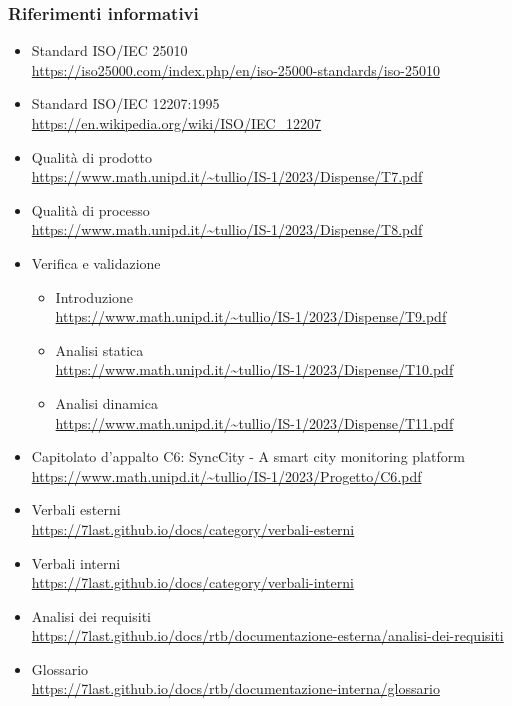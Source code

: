 \subsubsection{Riferimenti informativi}
\begin{itemize}
    \item Standard ISO/IEC 25010 \\
        \url{https://iso25000.com/index.php/en/iso-25000-standards/iso-25010}
    \item Standard ISO/IEC 12207:1995 \\
        \url{https://en.wikipedia.org/wiki/ISO/IEC_12207}
    \item Qualità di prodotto \\
        \url{https://www.math.unipd.it/~tullio/IS-1/2023/Dispense/T7.pdf}
    \item Qualità di processo \\
        \url{https://www.math.unipd.it/~tullio/IS-1/2023/Dispense/T8.pdf}
    \item Verifica e validazione
        \begin{itemize}
            \item Introduzione \\
                \url{https://www.math.unipd.it/~tullio/IS-1/2023/Dispense/T9.pdf}
            \item Analisi statica \\
                \url{https://www.math.unipd.it/~tullio/IS-1/2023/Dispense/T10.pdf}
            \item Analisi dinamica \\
                \url{https://www.math.unipd.it/~tullio/IS-1/2023/Dispense/T11.pdf}
        \end{itemize}
    \item Capitolato d'appalto C6: SyncCity - A smart city monitoring platform \\
        \url{https://www.math.unipd.it/~tullio/IS-1/2023/Progetto/C6.pdf}
    \item Verbali esterni \\
        \url{https://7last.github.io/docs/category/verbali-esterni}
    \item Verbali interni \\
        \url{https://7last.github.io/docs/category/verbali-interni}
    \item Analisi dei requisiti \\
        \url{https://7last.github.io/docs/rtb/documentazione-esterna/analisi-dei-requisiti}
    \item Glossario \\
        \url{https://7last.github.io/docs/rtb/documentazione-interna/glossario}
\end{itemize}